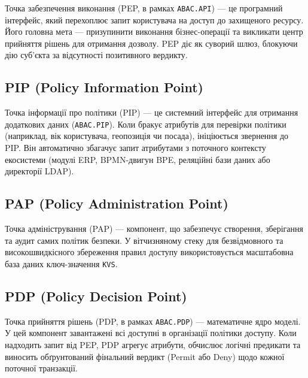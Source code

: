 Точка забезпечення виконання (PEP, в рамках \texttt{ABAC.API}) — це програмний інтерфейс, який перехоплює запит користувача на доступ до захищеного ресурсу. Його головна мета — призупинити виконання бізнес-операції та викликати центр прийняття рішень для отримання дозволу. PEP діє як суворий шлюз, блокуючи дію суб'єкта за відсутності позитивного вердикту.

\subsection{PIP (Policy Information Point)}

Точка інформації про політики (PIP) — це системний інтерфейс для отримання додаткових даних (\texttt{ABAC.PIP}). Коли бракує атрибутів для перевірки політики (наприклад, вік користувача, геопозиція чи посада), ініціюється звернення до PIP. Він автоматично збагачує запит атрибутами з поточного контексту екосистеми (модулі ERP, BPMN-двигун BPE, реляційні бази даних або директорії LDAP).

\subsection{PAP (Policy Administration Point)}

Точка адміністрування (PAP) — компонент, що забезпечує створення, зберігання та аудит самих політик безпеки. У вітчизняному стеку для безвідмовного та високошвидкісного збереження правил доступу використовується масштабовна база даних ключ-значення \texttt{KVS}.

\subsection{PDP (Policy Decision Point)}

Точка прийняття рішень (PDP, в рамках \texttt{ABAC.PDP}) — математичне ядро моделі. У цей компонент завантажені всі доступні в організації політики доступу. Коли надходить запит від PEP, PDP агрегує атрибути, обчислює логічні предикати та виносить обґрунтований фінальний вердикт (Permit або Deny) щодо кожної поточної транзакції.
